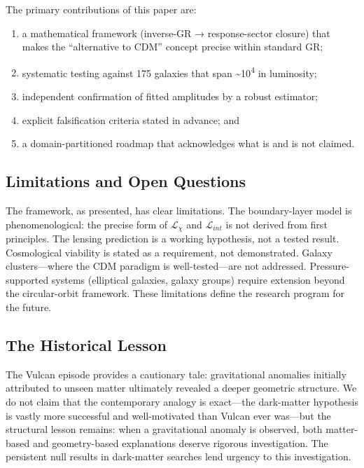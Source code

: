 \documentclass[11pt]{article}
\begin{document}
The primary contributions of this paper are:

\begin{enumerate}
\def\labelenumi{(\roman{enumi})}
\item
  a mathematical framework (inverse-GR → response-sector closure) that makes the ``alternative to CDM'' concept precise within standard GR;
\item
  systematic testing against 175 galaxies that span \textasciitilde10\textsuperscript{4} in luminosity;
\item
  independent confirmation of fitted amplitudes by a robust estimator;
\item
  explicit falsification criteria stated in advance; and
\item
  a domain-partitioned roadmap that acknowledges what is and is not claimed.
\end{enumerate}

\subsection{Limitations and Open Questions}\label{limitations-and-open-questions}

The framework, as presented, has clear limitations. The boundary-layer model is phenomenological: the precise form of \(\mathcal{L}_{\chi}\) and \(\mathcal{L}_{int}\) is not derived from first principles. The lensing prediction is a working hypothesis, not a tested result. Cosmological viability is stated as a requirement, not demonstrated. Galaxy clusters---where the CDM paradigm is well-tested---are not addressed. Pressure-supported systems (elliptical galaxies, galaxy groups) require extension beyond the circular-orbit framework. These limitations define the research program for the future.

\subsection{The Historical Lesson}\label{the-historical-lesson}

The Vulcan episode \citep{LeVerrier1859Mercury, Einstein1915Mercury, Einstein1916GR} provides a cautionary tale: gravitational anomalies initially attributed to unseen matter ultimately revealed a deeper geometric structure. We do not claim that the contemporary analogy is exact---the dark-matter hypothesis is vastly more successful and well-motivated than Vulcan ever was---but the structural lesson remains: when a gravitational anomaly is observed, both matter-based and geometry-based explanations deserve rigorous investigation. The persistent null results in dark-matter searches lend urgency to this investigation.
\end{document}
